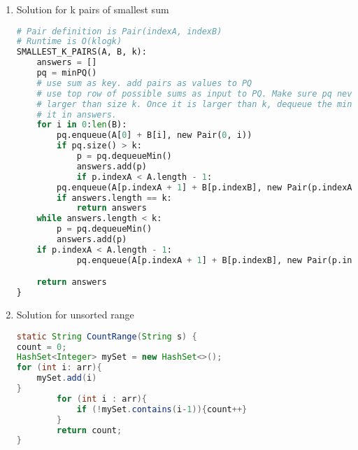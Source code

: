 \documentclass{article}
\begin{document}
\begin{enumerate}
\item Solution for k pairs of smallest sum
\begin{lstlisting}[language=python]
# Pair definition is Pair(indexA, indexB)
# Runtime is O(klogk)
SMALLEST_K_PAIRS(A, B, k):
    answers = []
    pq = minPQ()
    # use sum as key. add pairs as values to PQ
    # use top row of possible sums as input to PQ. Make sure pq never grows
    # larger than size k. Once it is larger than k, dequeue the min and place
    # it in answers.
    for i in 0:len(B):
        pq.enqueue(A[0] + B[i], new Pair(0, i))
        if pq.size() > k:
            p = pq.dequeueMin()
            answers.add(p)
            if p.indexA < A.length - 1:
		pq.enqueue(A[p.indexA + 1] + B[p.indexB], new Pair(p.indexA + 1, p.indexB))
        if answers.length == k:
            return answers
    while answers.length < k:
        p = pq.dequeueMin()
        answers.add(p)
	if p.indexA < A.length - 1:
            pq.enqueue(A[p.indexA + 1] + B[p.indexB], new Pair(p.indexA + 1, p.indexB))

    return answers
}
\end{lstlisting}

\item Solution for unsorted range
\begin{lstlisting}[language=Java]
static String CountRange(String s) {
count = 0;
HashSet<Integer> mySet = new HashSet<>();
for (int i: arr){
    mySet.add(i)
}
        for (int i : arr){
            if (!mySet.contains(i-1)){count++}
        }
        return count;
}
\end{lstlisting}

\end{enumerate}
\end{document}
